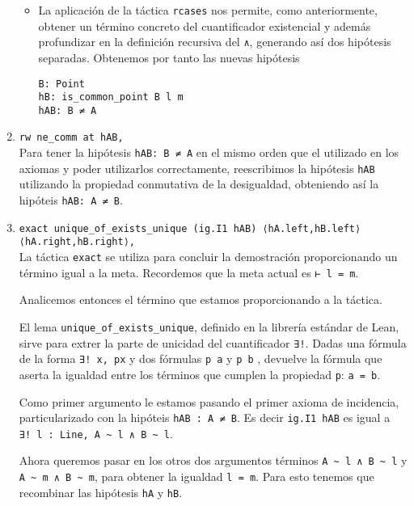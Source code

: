 \begin{enumerate}[label=L.\arabic*, topsep=0mm]
\begin{itemize}
		      \item La aplicación de la táctica \lstinline{rcases} nos permite, como
		            anteriormente, obtener un término concreto del cuantificador
		            existencial y además profundizar en la definición recursiva del
		            \lstinline{∧}, generando así dos hipótesis separadas. Obtenemos por
		            tanto las nuevas hipótesis
		            \begin{lstlisting}
B: Point 
hB: is_common_point B l m 
hAB: B ≠ A
\end{lstlisting}
	      \end{itemize}

	\item \lstinline{rw ne_comm at hAB,}\\[.5em] Para tener la hipótesis
	      \lstinline{hAB: B ≠ A} en el mismo orden que el utilizado en los axiomas y
	      poder utilizarlos correctamente, reescribimos la hipótesis \lstinline{hAB}
	      utilizando la propiedad conmutativa de la desigualdad, obteniendo así la
	      hipóteis \lstinline{hAB: A ≠ B}.

	\item \lstinline{exact unique_of_exists_unique (ig.I1 hAB) ⟨hA.left,hB.left⟩ ⟨hA.right,hB.right⟩,}\\[.5em]
	      La táctica \lstinline{exact} se utiliza para concluir la demostración
	      proporcionando un término igual a la meta. Recordemos que la meta actual
	      es \lstinline{⊢ l = m}.

	      Analicemos entonces el término que estamos proporcionando a la táctica.

	      El lema \lstinline{unique_of_exists_unique}, definido en la librería
	      estándar de Lean, sirve para extrer la parte de unicidad del cuantificador
	      \lstinline{∃!}. Dadas una fórmula de la forma \lstinline{∃! x, px} y dos
	      fórmulas \lstinline{p a} y \lstinline{p b} , devuelve la fórmula que
	      aserta la igualdad entre los términos que cumplen la propiedad
	      \lstinline{p}: \lstinline{a = b}.

	      Como primer argumento le estamos pasando el primer axioma de incidencia,
	      particularizado con la hipóteis \lstinline{hAB : A ≠ B}. Es decir
	      \lstinline{ig.I1 hAB} es igual a\\ \lstinline{∃! l : Line, A ~ l ∧ B ~ l}.

	      Ahora queremos pasar en los otros dos argumentos términos
	      \lstinline{A ~ l ∧ B ~ l} y \lstinline{A ~ m ∧ B ~ m}, para obtener la
	      igualdad \lstinline{l = m}. Para esto tenemos que recombinar las hipótesis
	      \lstinline{hA} y \lstinline{hB}.


\end{enumerate}
